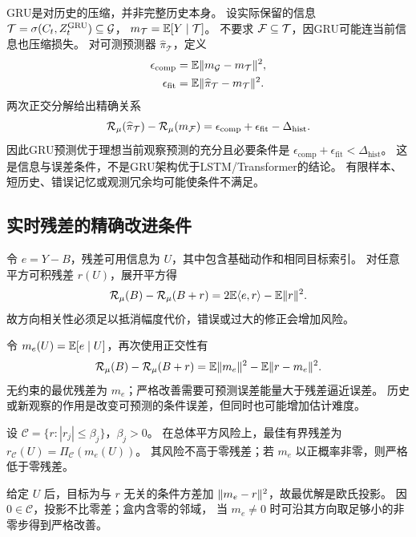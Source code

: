 GRU是对历史的压缩，并非完整历史本身。
设实际保留的信息 $\mathcal T=\sigma(C_t,Z_t^{\mathrm{GRU}})\subseteq\mathcal{G}$，
$m_\mathcal T=\mathbb{E}[Y\mid\mathcal T]$。
不要求 $\mathcal{F}\subseteq\mathcal T$，因GRU可能连当前信息也压缩损失。
对可测预测器 $\widehat\pi_\mathcal T$，定义
\begin{align}
 \epsilon_{\mathrm{comp}}&=\mathbb{E}\lVert m_{\mathcal{G}}-m_\mathcal T\rVert^2,\nonumber\\
 \epsilon_{\mathrm{fit}}&=\mathbb{E}\lVert\widehat\pi_\mathcal T-m_\mathcal T\rVert^2.
\end{align}
两次正交分解给出精确关系
\begin{equation}
 \mathcal R_\mu(\widehat\pi_\mathcal T)-\mathcal R_\mu(m_{\mathcal{F}})
 =\epsilon_{\mathrm{comp}}+\epsilon_{\mathrm{fit}}-\Delta_{\mathrm{hist}}.
 \label{eq:gru_condition}
\end{equation}
因此GRU预测优于理想当前观察预测的充分且必要条件是
$\epsilon_{\mathrm{comp}}+\epsilon_{\mathrm{fit}}<\Delta_{\mathrm{hist}}$。
这是信息与误差条件，不是GRU架构优于LSTM/Transformer的结论。
有限样本、短历史、错误记忆或观测冗余均可能使条件不满足。

\subsection{实时残差的精确改进条件}

令 $e=Y-B$，残差可用信息为 $U$，其中包含基础动作和相同目标索引。
对任意平方可积残差 $r(U)$，展开平方得
\begin{equation}
 \mathcal R_\mu(B)-\mathcal R_\mu(B+r)
 =2\mathbb{E}\langle e,r\rangle-\mathbb{E}\lVert r\rVert^2.
 \label{eq:alignment}
\end{equation}
故方向相关性必须足以抵消幅度代价，错误或过大的修正会增加风险。

令 $m_e(U)=\mathbb{E}[e\mid U]$，再次使用正交性有
\begin{equation}
 \mathcal R_\mu(B)-\mathcal R_\mu(B+r)
 =\mathbb{E}\lVert m_e\rVert^2-\mathbb{E}\lVert r-m_e\rVert^2.
 \label{eq:residual_condition}
\end{equation}
无约束的最优残差为 $m_e$；严格改善需要可预测误差能量大于残差逼近误差。
历史或新观察的作用是改变可预测的条件误差，但同时也可能增加估计难度。

\begin{proposition}[有界最优残差]
\label{prop:bounded}
设 $\mathcal C=\{r:|r_j|\leq\beta_j\}$，$\beta_j>0$。
在总体平方风险上，最佳有界残差为
$r_{\mathcal C}(U)=\Pi_{\mathcal C}(m_e(U))$。
其风险不高于零残差；若 $m_e$ 以正概率非零，则严格低于零残差。
\end{proposition}
\begin{IEEEproof}
给定 $U$ 后，目标为与 $r$ 无关的条件方差加
$\lVert m_e-r\rVert^2$，故最优解是欧氏投影。
因 $0\in\mathcal C$，投影不比零差；盒内含零的邻域，
当 $m_e\ne0$ 时可沿其方向取足够小的非零步得到严格改善。
\end{IEEEproof}

